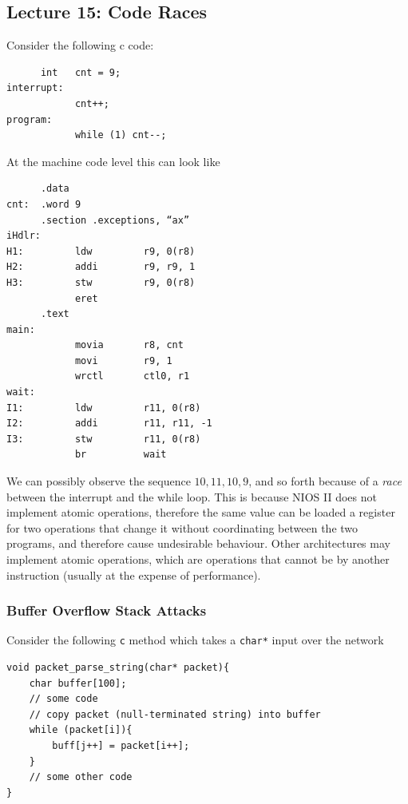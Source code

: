 \documentclass[../notes.tex]{subfiles}
\begin{document}
\subsection{Lecture 15: Code Races}

Consider the following c code:

\begin{listing}[H]
\begin{verbatim}
      int   cnt = 9;
interrupt:
            cnt++;
program:
            while (1) cnt--;
\end{verbatim}
\end{listing}

At the machine code level this can look like

\begin{listing}[H]
\begin{verbatim}
      .data
cnt:  .word 9
      .section .exceptions, “ax”
iHdlr:     
H1:         ldw         r9, 0(r8)
H2:         addi        r9, r9, 1  
H3:         stw         r9, 0(r8)
            eret
      .text
main:
            movia       r8, cnt
            movi        r9, 1
            wrctl       ctl0, r1
wait:      
I1:         ldw         r11, 0(r8)
I2:         addi        r11, r11, -1
I3:         stw         r11, 0(r8)
            br          wait
\end{verbatim}
\end{listing}


We can possibly observe the sequence $ 10, 11, 10, 9$, and so forth because of a \textit{race} between the interrupt and the while loop.
This is because NIOS II does not implement atomic operations, therefore the same value can be loaded a register for two operations that change it without coordinating between the two programs, and therefore cause undesirable behaviour.
Other architectures may implement atomic operations, which are operations that cannot be by another instruction (usually at the expense of performance).

\subsubsection{Buffer Overflow Stack Attacks}

Consider the following \texttt{c} method which takes a \texttt{char*} input over the network


\begin{listing}[H]
\begin{verbatim}
void packet_parse_string(char* packet){
	char buffer[100];
	// some code
	// copy packet (null-terminated string) into buffer
	while (packet[i]){
		buff[j++] = packet[i++];
	}
	// some other code
}
\end{verbatim}
\end{listing}
\end{document}
